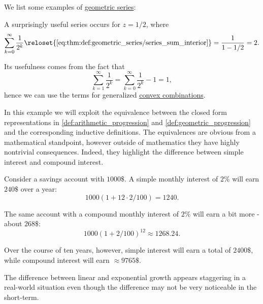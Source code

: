 \begin{example}\label{ex:def:geometric_series}
  We list some examples of \hyperref[def:geometric_series]{geometric series}:
  \begin{thmenum}
     A surprisingly useful series occurs for \( z = 1 / 2 \), where
    \begin{equation}\label{eq:ex:def:geometric_series/two}
      \sum_{k=0}^\infty \frac 1 {2^k}
      \reloset {\eqref{eq:thm:def:geometric_series/series_sum_interior}} =
      \frac 1 {1 - 1 / 2}
      =
      2.
    \end{equation}

    Its usefulness comes from the fact that
    \begin{equation}\label{eq:ex:def:geometric_series/two/one}
      \sum_{k=1}^\infty \frac 1 {2^k}
      =
      \sum_{k=0}^\infty \frac 1 {2^k} - 1
      =
      1,
    \end{equation}
    hence we can use the terms for generalized \hyperref[def:convex_hull]{convex combinations}.

     In this example we will exploit the equivalence between the closed form representations in \cref{def:arithmetic_progression} and \cref{def:geometric_progression} and the corresponding inductive definitions. The equivalences are obvious from a mathematical standpoint, however outside of mathematics they have highly nontrivial consequences. Indeed, they highlight the difference between simple interest and compound interest.

    Consider a savings account with \( 1000\$ \). A simple monthly interest of \( 2\% \) will earn \( 240\$ \) over a year:
    \begin{equation*}
      1000 (1 + 12 \cdot 2 / 100) = 1240.
    \end{equation*}

    The same account with a compound monthly interest of \( 2\% \) will earn a bit more - about \( 268\$ \):
    \begin{equation*}
      1000 (1 + 2 / 100)^{12} \approx 1268.24.
    \end{equation*}

    Over the course of ten years, however, simple interest will earn a total of \( 2400\$ \), while compound interest will earn \( \approx 9765\$ \).

    The difference between linear and exponential growth appears staggering in a real-world situation even though the difference may not be very noticeable in the short-term.


\end{thmenum}
\end{example}
